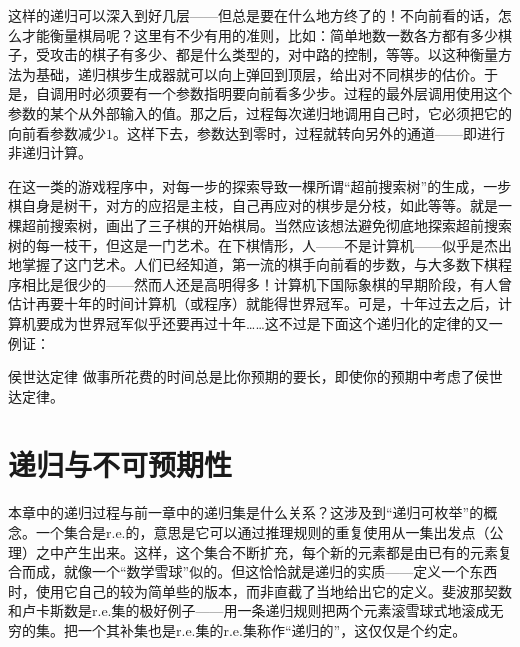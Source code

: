 这样的递归可以深入到好几层——但总是要在什么地方终了的！不向前看的话，怎么才能衡量棋局呢？这里有不少有用的准则，比如：简单地数一数各方都有多少棋子，受攻击的棋子有多少、都是什么类型的，对中路的控制，等等。以这种衡量方法为基础，递归棋步生成器就可以向上弹回到顶层，给出对不同棋步的估价。于是，自调用时必须要有一个参数指明要向前看多少步。过程的最外层调用使用这个参数的某个从外部输入的值。那之后，过程每次递归地调用自己时，它必须把它的向前看参数减少$1$。这样下去，参数达到零时，过程就转向另外的通道——即进行非递归计算。

在这一类的游戏程序中，对每一步的探索导致一棵所谓“超前搜索树”的生成，一步棋自身是树干，对方的应招是主枝，自己再应对的棋步是分枝，如此等等。就是一棵超前搜索树，画出了三子棋的开始棋局。当然应该想法避免彻底地探索超前搜索树的每一枝干，但这是一门艺术。在下棋情形，人——不是计算机——似乎是杰出地掌握了这门艺术。人们已经知道，第一流的棋手向前看的步数，与大多数下棋程序相比是很少的——然而人还是高明得多！计算机下国际象棋的早期阶段，有人曾估计再要十年的时间计算机（或程序）就能得世界冠军。可是，十年过去之后，计算机要成为世界冠军似乎还要再过十年……这不过是下面这个递归化的定律的又一例证：
\begin{thm}{侯世达定律}
做事所花费的时间总是比你预期的要长，即使你的预期中考虑了侯世达定律。
\end{thm}

\section{递归与不可预期性}

本章中的递归过程与前一章中的递归集是什么关系？这涉及到“递归可枚举”的概念。一个集合是r.e.的，意思是它可以通过推理规则的重复使用从一集出发点（公理）之中产生出来。这样，这个集合不断扩充，每个新的元素都是由已有的元素复合而成，就像一个“数学雪球”似的。但这恰恰就是递归的实质——定义一个东西时，使用它自己的较为简单些的版本，而非直截了当地给出它的定义。斐波那契数和卢卡斯数是r.e.集的极好例子——用一条递归规则把两个元素滚雪球式地滚成无穷的集。把一个其补集也是r.e.集的r.e.集称作“递归的”，这仅仅是个约定。

